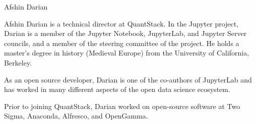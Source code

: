 \begin{participant}[type=leadPI,PM=6,gender=male]{Afshin Darian}

  Afshin Darian is a technical director at QuantStack. In the Jupyter project, Darian is a member of the Jupyter Notebook, JupyterLab, and Jupyter Server councils, and a member of the steering committee of the project.
  He holds a master's degree in history (Medieval Europe) from the University of California, Berkeley.

  As an open source developer, Darian is one of the co-authors of JupyterLab and has worked in many different aspects of the open data science ecosystem.

  Prior to joining QuantStack, Darian worked on open-source software at Two Sigma, Anaconda, Alfresco, and OpenGamma.
\end{participant}

